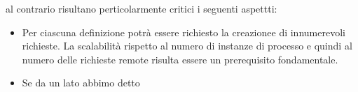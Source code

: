 al contrario risultano perticolarmente critici i seguenti aspettti:
\begin{itemize}
  \item Per ciascuna definizione potr\`a essere richiesto la creazionee di
  innumerevoli richieste. La scalabilit\`a rispetto al numero di instanze di
  processo e quindi al numero delle richieste remote risulta essere un
  prerequisito fondamentale.
  
  \item Se da un lato abbimo detto 
\end{itemize}

 

